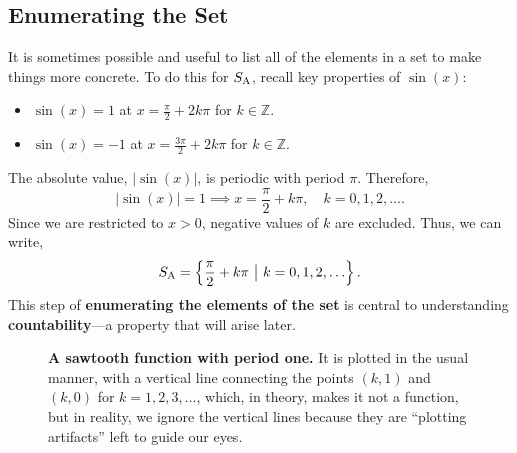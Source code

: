 \subsection*{Enumerating the Set}

It is sometimes possible and useful to list all of the elements in a set to make things more concrete. To do this for $S_{\rm A}$, recall key properties of $\sin(x)$:
\begin{itemize}
    \item $\sin(x) = 1$ at $x = \frac{\pi}{2} + 2k\pi$ for $k \in \mathbb{Z}$.
    \item $\sin(x) = -1$ at $x = \frac{3\pi}{2} + 2k\pi$ for $k \in \mathbb{Z}$.
\end{itemize}

The absolute value, $|\sin(x)|$, is periodic with period $\pi$. Therefore,
\[
|\sin(x)| = 1 \implies x = \frac{\pi}{2} + k\pi, \quad k = 0, 1, 2, \ldots. 
\]
Since we are restricted to $x > 0$, negative values of $k$ are excluded. Thus, we can write,
\[
S_{\rm A} = \left\{ \frac{\pi}{2} + k\pi ~\big|~ k = 0, 1, 2, \ldots \right\}.
\]
This step of \textbf{enumerating the elements of the set} is central to understanding \textbf{countability}—a property that will arise later.

\begin{figure}[htb]%
\centering
{}
\caption[]{\textbf{A sawtooth function with period one.} It is plotted in the usual manner, with a vertical line connecting the points $(k,1)$ and $(k, 0)$ for $k=1, 2, 3, \ldots$, which, in theory, makes it not a function, but in reality, we ignore the vertical lines because they are ``plotting artifacts'' left to guide our eyes.}
\label{fig:SawtoothFunction}
\end{figure}

